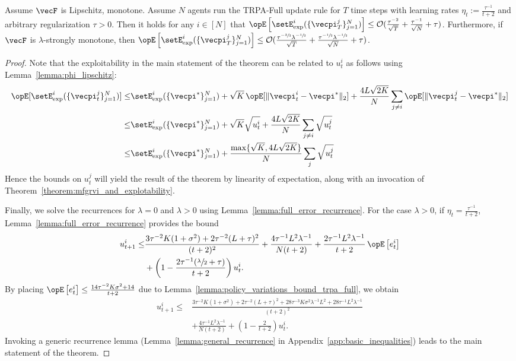 \begin{theorem}\label{theorem:expert_short}
Assume $\vecF$ is Lipschitz, monotone.
Assume $N$ agents run the TRPA-Full update rule for $T$ time steps with learning rates $\eta_t := \frac{\tau^{-1}}{t+2}$ and arbitrary regularization $\tau>0$.
Then it holds for any $i\in[N]$ that $\Exop\left[ \setE^i_{\text{exp}}( \{\vecpi^j_{T}\}_{j=1}^N ) \right] \leq \mathcal{O} (\frac{\tau^{-2}}{\sqrt{T}}+ \frac{\tau^{-1}}{\sqrt{N}} + \tau)$.
Furthermore, if $\vecF$ is $\lambda$-strongly monotone, then $\Exop\left[ \setE^i_{\text{exp}}( \{\vecpi^j_{T}\}_{j=1}^N ) \right] \leq \mathcal{O} (\frac{\tau^{-\sfrac{3}{2}} \lambda^{-\sfrac{1}{2}}}{\sqrt{T}} + \frac{\tau^{-\sfrac{1}{2}} \lambda^{-\sfrac{1}{2}}}{\sqrt{N}} + \tau)$.
\end{theorem}
\begin{proof}
Note that the exploitability in the main statement of the theorem can be related to $u_t^i$ as follows using Lemma~\ref{lemma:phi_lipschitz}:
\begin{align*}
    \Exop[\setE^i_{\text{exp}}(\{\vecpi^j_{t}\}_{j=1}^N)] \leq &\setE^i_{\text{exp}}(\{\vecpi^*\}_{j=1}^N) + \sqrt{K} \Exop[\| \vecpi_t^i - \vecpi^* \|_2] + \frac{4L\sqrt{2K}}{N} \sum_{j\neq i} \Exop[\| \vecpi_t^j - \vecpi^* \|_2] \\
    \leq & \setE^i_{\text{exp}}(\{\vecpi^*\}_{j=1}^N) + \sqrt{K} \sqrt{u_t^i} +  \frac{4L\sqrt{2K}}{N} \sum_{j\neq i} \sqrt{u_t^j} \\
    \leq & \setE^i_{\text{exp}}(\{\vecpi^*\}_{j=1}^N) + \frac{\max\{ \sqrt{K}, 4L\sqrt{2K} \}}{N} \sum_{j} \sqrt{u_t^j}
\end{align*}
Hence the bounds on $u_t^j$ will yield the result of the theorem by linearity of expectation, along with an invocation of Theorem~\ref{theorem:mfgrvi_and_explotability}.

Finally, we solve the recurrences for $\lambda = 0$ and $\lambda > 0$ using Lemma~\ref{lemma:full_error_recurrence}.
For the case $\lambda > 0$, if $\eta_t=\frac{\tau^{-1}}{t+2}$, Lemma~\ref{lemma:full_error_recurrence} provides the bound 
\begin{align*}
    u_{t+1}^i \leq &\frac{ 3\tau^{-2} K(1 + \sigma^2) + 2\tau^{-2}(L+\tau)^2}{(t+2)^2} + \frac{4\tau^{-1} L^2 \lambda^{-1}}{ N (t+2)} + \frac{2\tau^{-1} L^2 \lambda^{-1}}{t+2} \Exop\left[e_t^i\right] \\
        &+ \left(1 - \frac{2 \tau^{-1}(\sfrac{\lambda}{2} + \tau)}{t+2}\right) u_{t}^i. 
\end{align*}
By placing $\Exop\left[ e^i_t\right] \leq \frac{14 \tau^{-2} K\sigma^2 + 14}{t+2}$ due to Lemma~\ref{lemma:policy_variations_bound_trpa_full}, we obtain
\begin{align*}
    u_{t+1}^i \leq &\frac{ 3\tau^{-2}K(1 + \sigma^2) + 2\tau^{-2}(L+\tau)^2 +  28\tau^{-3} K \sigma^2 \lambda^{-1} L^2 + 28 \tau^{-1} L^2 \lambda^{-1}}{(t+2)^2} \\
        &+ \frac{4\tau^{-1} L^2 \lambda^{-1}}{ N (t+2)} + \left(1 - \frac{2}{t+2}\right) u_{t}^i.
\end{align*}
Invoking a generic recurrence lemma (Lemma~\ref{lemma:general_recurrence} in Appendix~\ref{app:basic_inequalities}) leads to the main statement of the theorem.


\end{proof}
